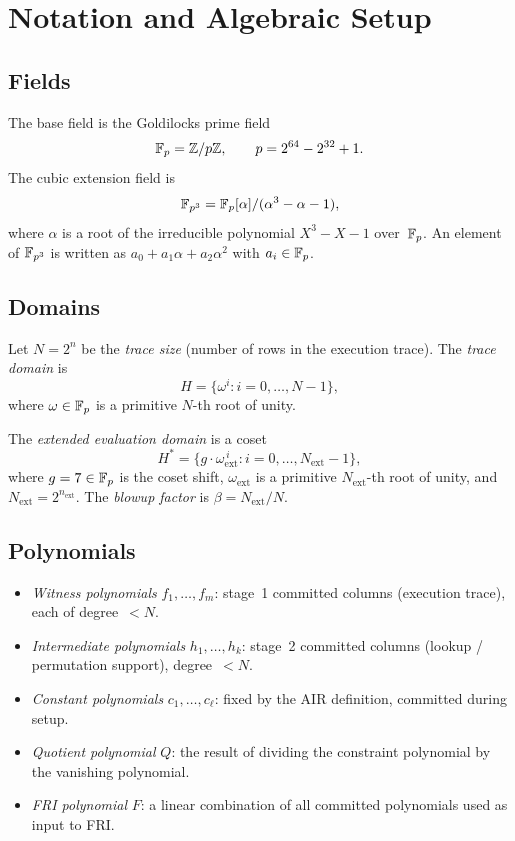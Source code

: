\section{Notation and Algebraic Setup}
\label{sec:notation}

\subsection{Fields}

The base field is the Goldilocks prime field
\[
  \mathbb{F}_p = \mathbb{Z}/p\mathbb{Z}, \qquad p = 2^{64} - 2^{32} + 1.
\]
The cubic extension field is
\[
  \mathbb{F}_{p^3} = \mathbb{F}_p[\alpha] / (\alpha^3 - \alpha - 1),
\]
where $\alpha$ is a root of the irreducible polynomial $X^3 - X - 1$ over~$\mathbb{F}_p$.
An element of $\mathbb{F}_{p^3}$ is written as $a_0 + a_1\alpha + a_2\alpha^2$ with $a_i \in \mathbb{F}_p$.

\subsection{Domains}

Let $N = 2^n$ be the \emph{trace size} (number of rows in the execution trace).
The \emph{trace domain} is
\[
  H = \bigl\{\omega^i : i = 0, \ldots, N-1\bigr\},
\]
where $\omega \in \mathbb{F}_p$ is a primitive $N$-th root of unity.

The \emph{extended evaluation domain} is a coset
\[
  H^* = \bigl\{g \cdot \omega_{\mathrm{ext}}^{\,i} : i = 0, \ldots, N_{\mathrm{ext}}-1\bigr\},
\]
where $g = 7 \in \mathbb{F}_p$ is the coset shift,
$\omega_{\mathrm{ext}}$ is a primitive $N_{\mathrm{ext}}$-th root of unity,
and $N_{\mathrm{ext}} = 2^{n_{\mathrm{ext}}}$.
The \emph{blowup factor} is $\beta = N_{\mathrm{ext}} / N$.

\subsection{Polynomials}

\begin{itemize}[nosep]
  \item \emph{Witness polynomials} $f_1, \ldots, f_m$:
        stage~1 committed columns (execution trace), each of degree~$< N$.
  \item \emph{Intermediate polynomials} $h_1, \ldots, h_k$:
        stage~2 committed columns (lookup / permutation support), degree~$< N$.
  \item \emph{Constant polynomials} $c_1, \ldots, c_\ell$:
        fixed by the AIR definition, committed during setup.
  \item \emph{Quotient polynomial} $Q$:
        the result of dividing the constraint polynomial by the vanishing polynomial.
  \item \emph{FRI polynomial} $F$:
        a linear combination of all committed polynomials used as input to FRI.
\end{itemize}

